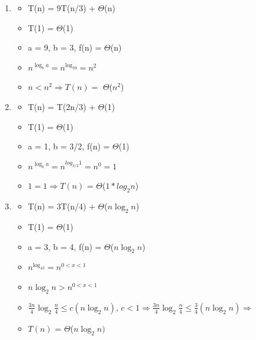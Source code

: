 \documentclass{report}
\newcommand{\T}[1]{$\Theta$(#1)}
\begin{document}
                \begin{enumerate}
                    \item \begin{itemize}
                        \item T(n) = 9T(n/3) + \T{n}
                        \item T(1) = \T{1}
                        \item a = 9, b = 3, f(n) = \T{n}
                        \item $n^{\log_ba} = n^{\log_39} = n^2$
                        \item $n < n^2 \Longrightarrow T\left(n\right) =$ \T{$n^2$}
                    \end{itemize}
                    \item \begin{itemize}
                        \item T(n) = T(2n/3) + \T{1}
                        \item T(1) = \T{1}
                        \item a = 1, b = 3/2, f(n) = \T{1}
                        \item $n^{\log_ba} = n^{log_{3/2}1} = n^0 = 1$
                        \item $1 = 1 \Longrightarrow T\left(n\right)$ = \T{$1 * log_2n$}
                    \end{itemize}
                    \item \begin{itemize}
                        \item T(n) = 3T(n/4) + \T{$n\log_2n$}
                        \item T(1) = \T{1}
                        \item a = 3, b = 4, f(n) = \T{$n\log_2n$}
                        \item $n^{\log_43} = n^{0<x<1}$
                        \item $n\log_2n > n^{0<x<1}$
                        \item $\frac{3n}{4}\log_2\frac{n}{4} \leq c(n\log_2n), \, c < 1 
                            \Longrightarrow \frac{3n}{4}\log_2\frac{n}{4} \leq \frac{3}{4}(n\log_2n)
                            \Longrightarrow$
                        \item $T\left(n\right)$ = \T{$n\log_2n}$
                    \end{itemize}
                \end{enumerate}
\end{document}
